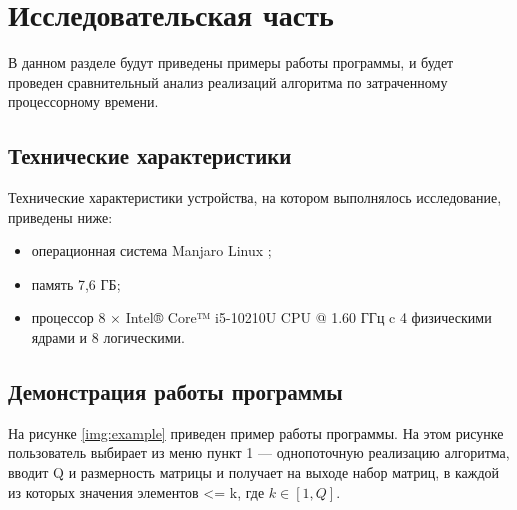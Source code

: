 \chapter{Исследовательская часть}

В данном разделе будут приведены примеры работы программы, и будет проведен сравнительный анализ реализаций алгоритма по затраченному процессорному времени.

\section{Технические характеристики}

Технические характеристики устройства, на котором выполнялось исследование, приведены ниже:

\begin{itemize}
	\item операционная система Manjaro Linux \cite{manjaro};
	\item память 7,6 ГБ;
	\item процессор 8 × Intel® Core™ i5-10210U CPU @ 1.60 ГГц \cite{intel} c 4 физическими ядрами и 8 логическими.
\end{itemize}

\clearpage

\section{Демонстрация работы программы}

На рисунке \ref{img:example} приведен пример работы программы. На этом рисунке пользователь выбирает из меню пункт 1 --- однопоточную реализацию алгоритма, вводит Q и размерность матрицы и получает на выходе набор матриц, в каждой из которых значения элементов <= k, где $k\in [1,Q]$.

